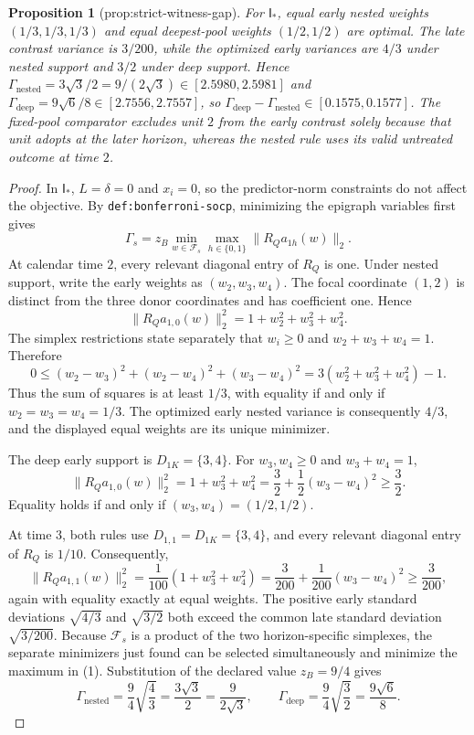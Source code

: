 \documentclass{article}
\newtheorem{proposition}{Proposition}
\begin{document}
\begin{proposition}[prop:strict-witness-gap]\label{prop:strict-witness-gap}
For \(\mathsf I_*\), equal early nested weights \((1/3,1/3,1/3)\) and equal deepest-pool weights \((1/2,1/2)\) are optimal. The late contrast variance is \(3/200\), while the optimized early variances are \(4/3\) under nested support and \(3/2\) under deep support. Hence \(\Gamma_{\mathrm{nested}}=3\sqrt3/2=9/(2\sqrt3)\in[2.5980,2.5981]\) and \(\Gamma_{\mathrm{deep}}=9\sqrt6/8\in[2.7556,2.7557]\), so \(\Gamma_{\mathrm{deep}}-\Gamma_{\mathrm{nested}}\in[0.1575,0.1577]\). The fixed-pool comparator excludes unit \(2\) from the early contrast solely because that unit adopts at the later horizon, whereas the nested rule uses its valid untreated outcome at time \(2\).
\end{proposition}
\begin{proof}
In \(\mathsf I_*\), \(L=\delta=0\) and \(x_i=0\), so the predictor-norm
constraints do not affect the objective.  By
\texttt{def:bonferroni-socp}, minimizing the epigraph variables first gives
\[
 \Gamma_s=z_B\min_{w\in\mathcal F_s}
 \max_{h\in\{0,1\}}\lVert R_Qa_{1h}(w)\rVert_2. \tag{1}
\]
At calendar time \(2\), every relevant diagonal entry of \(R_Q\) is one.
Under nested support, write the early weights as
\((w_2,w_3,w_4)\).  The focal coordinate \((1,2)\) is distinct from the
three donor coordinates and has coefficient one.  Hence
\[
 \lVert R_Qa_{1,0}(w)\rVert_2^2
 =1+w_2^2+w_3^2+w_4^2. \tag{2}
\]
The simplex restrictions state separately that \(w_i\geq0\) and
\(w_2+w_3+w_4=1\).  Therefore
\[
 0\leq (w_2-w_3)^2+(w_2-w_4)^2+(w_3-w_4)^2
 =3(w_2^2+w_3^2+w_4^2)-1. \tag{3}
\]
Thus the sum of squares is at least \(1/3\), with equality if and only if
\(w_2=w_3=w_4=1/3\).  The optimized early nested variance is consequently
\(4/3\), and the displayed equal weights are its unique minimizer.

The deep early support is \(D_{1K}=\{3,4\}\).  For
\(w_3,w_4\geq0\) and \(w_3+w_4=1\),
\[
 \lVert R_Qa_{1,0}(w)\rVert_2^2
 =1+w_3^2+w_4^2
 =\frac32+\frac12(w_3-w_4)^2\geq\frac32. \tag{4}
\]
Equality holds if and only if \((w_3,w_4)=(1/2,1/2)\).

At time \(3\), both rules use \(D_{1,1}=D_{1K}=\{3,4\}\), and every
relevant diagonal entry of \(R_Q\) is \(1/10\).  Consequently,
\[
 \lVert R_Qa_{1,1}(w)\rVert_2^2
 =\frac1{100}(1+w_3^2+w_4^2)
 =\frac3{200}+\frac1{200}(w_3-w_4)^2
 \geq\frac3{200}, \tag{5}
\]
again with equality exactly at equal weights.  The positive early standard
deviations \(\sqrt{4/3}\) and \(\sqrt{3/2}\) both exceed the common late
standard deviation \(\sqrt{3/200}\).  Because \(\mathcal F_s\) is a product
of the two horizon-specific simplexes, the separate minimizers just found can
be selected simultaneously and minimize the maximum in (1).  Substitution of
the declared value \(z_B=9/4\) gives
\[
 \Gamma_{\mathrm{nested}}
 =\frac94\sqrt{\frac43}
 =\frac{3\sqrt3}{2}
 =\frac9{2\sqrt3},
 \qquad
 \Gamma_{\mathrm{deep}}
 =\frac94\sqrt{\frac32}
 =\frac{9\sqrt6}{8}. \tag{6}
\]


\end{proof}
\end{document}
